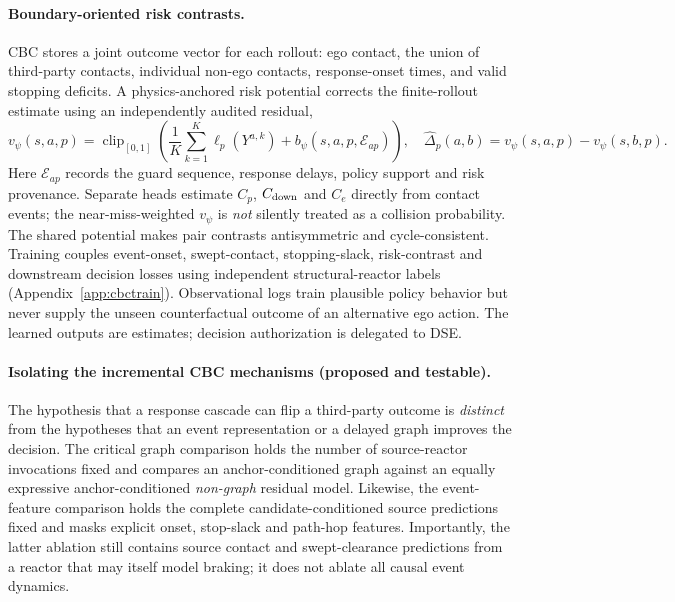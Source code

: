 \documentclass[10pt]{article}
\DeclareMathOperator{\clip}{clip}
\begin{document}
\paragraph{Boundary-oriented risk contrasts.}
CBC stores a joint outcome vector for each rollout: ego contact, the union of third-party contacts, individual non-ego contacts, response-onset times, and valid stopping deficits. A physics-anchored risk potential corrects the finite-rollout estimate using an independently audited residual,
\begin{equation}
 v_\psi(s,a,p)=\clip_{[0,1]}\!\left(
 \frac1K\sum_{k=1}^{K}\ell_p(Y^{a,k})+b_\psi(s,a,p,\mathcal E_{ap})\right),
 \quad\widehat\Delta_p(a,b)=v_\psi(s,a,p)-v_\psi(s,b,p).
 \label{eq:contrast}
\end{equation}
Here $\mathcal E_{ap}$ records the guard sequence, response delays, policy support and risk provenance. Separate heads estimate $C_p$, $C_{\rm down}$ and $C_e$ directly from contact events; the near-miss-weighted $v_\psi$ is \emph{not} silently treated as a collision probability. The shared potential makes pair contrasts antisymmetric and cycle-consistent. Training couples event-onset, swept-contact, stopping-slack, risk-contrast and downstream decision losses using independent structural-reactor labels (Appendix~\ref{app:cbctrain}). Observational logs train plausible policy behavior but never supply the unseen counterfactual outcome of an alternative ego action. The learned outputs are estimates; decision authorization is delegated to DSE.

\paragraph{Isolating the incremental CBC mechanisms (proposed and testable).}
The hypothesis that a response cascade can flip a third-party outcome is
\emph{distinct} from the hypotheses that an event representation or a delayed
graph improves the decision. The critical graph comparison holds the number of
source-reactor invocations fixed and compares an anchor-conditioned graph
against an equally expressive anchor-conditioned \emph{non-graph} residual
model. Likewise, the event-feature comparison holds the complete
candidate-conditioned source predictions fixed and masks explicit onset,
stop-slack and path-hop features. Importantly, the latter ablation still
contains source contact and swept-clearance predictions from a reactor that
may itself model braking; it does not ablate all causal event dynamics.
\end{document}
